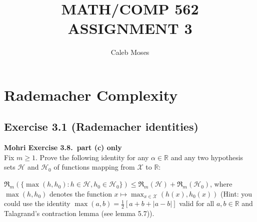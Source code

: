 \documentclass[
	10pt, %
	a4paper, %
	oneside, %
	headinclude,footinclude, %
	BCOR5mm, %
]{scrartcl}
\author{\spacedlowsmallcaps{Caleb Moses*}} %
\date{} %
\title{MATH/COMP 562 ASSIGNMENT 3}
\author{Caleb Moses}
\newenvironment{problem}[2][]
{ \begin{mdframed}[backgroundcolor=gray!20] \textbf{#1 #2} \\}
		{  \end{mdframed}}
\begin{document}
\maketitle

\section*{Rademacher Complexity}
\subsection*{Exercise 3.1 (Rademacher identities)}
\begin{problem}{Mohri Exercise 3.8.\ part (c) only}
Fix $m \geq 1$. Prove the following identity for any $\alpha \in \mathbb{R}$ and any two hypothesis sets $\mathcal{H}$ and $\mathcal{H}_0$ of functions mapping from $\mathcal{X}$ to $\mathbb{R}$:

$\mathfrak{R}_m(\{\max(h, h_0 ): h \in \mathcal{H}, h_0 \in \mathcal{H}_0 \}) \leq \mathfrak{R}_m (\mathcal{H}) + \mathfrak{R}_m (\mathcal{H}_0)$, where $\max(h, h_0 )$ denotes the function $x \mapsto \max_{x\in \mathcal{X}} (h(x), h_0 (x))$ (Hint: you could use the identity $\max(a, b) = \frac{1}{2} [a + b + |a - b|]$ valid for all $a, b \in \mathbb{R}$ and Talagrand’s contraction lemma (see lemma 5.7)).
\end{problem}
\end{document}
